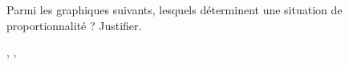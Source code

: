 
\begin{exercice}\label{exo2smath-0021}

    Parmi les graphiques suivants, lesquels déterminent une situation de proportionnalité ? Justifier.


    \begin{center}
,
,

    \end{center}

\end{exercice}
